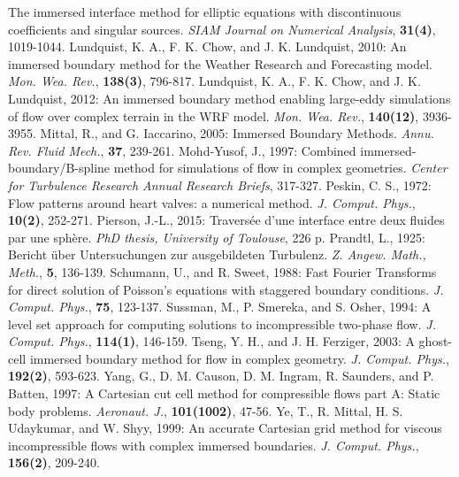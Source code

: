 The immersed interface method for elliptic equations with discontinuous coefficients and singular sources.
{\it SIAM Journal on Numerical Analysis}, {\bf 31(4)}, 1019-1044.
\decrefname
Lundquist, K. A., F. K. Chow, and J. K. Lundquist, 2010:
An immersed boundary method for the Weather Research and Forecasting model.
{\it Mon. Wea. Rev.}, {\bf 138(3)}, 796-817.
\decrefname
Lundquist, K. A., F. K. Chow, and J. K. Lundquist, 2012:
An immersed boundary method enabling large-eddy simulations of flow over complex terrain in the WRF model.
{\it Mon. Wea. Rev.}, {\bf 140(12)}, 3936-3955.
\decrefname
Mittal, R., and G. Iaccarino, 2005:
Immersed Boundary Methods.
{\it Annu. Rev. Fluid Mech.}, {\bf 37}, 239-261.
\decrefname
Mohd-Yusof, J., 1997:
Combined immersed-boundary/B-spline method for simulations of flow in complex geometries.
{\it Center for Turbulence Research Annual Research Briefs}, 317-327.
\decrefname
Peskin, C. S., 1972:
Flow patterns around heart valves: a numerical method.
{\it J. Comput. Phys.}, {\bf 10(2)}, 252-271.
\decrefname
Pierson, J.-L., 2015:
Traversée d’une interface entre deux fluides par une sphère.
{\it PhD thesis, University of Toulouse}, 226 p.
\decrefname
Prandtl, L., 1925:
Bericht über Untersuchungen zur ausgebildeten Turbulenz.
{\it Z. Angew. Math., Meth.}, {\bf 5}, 136-139.
\decrefname
Schumann, U., and R. Sweet, 1988:
Fast Fourier Transforms for direct solution of Poisson's equations with staggered boundary conditions.
{\it J. Comput. Phys.}, {\bf 75}, 123-137.
\decrefname
Sussman, M., P. Smereka, and S. Osher, 1994:
A level set approach for computing solutions to incompressible two-phase flow.
{\it J. Comput. Phys.}, {\bf 114(1)}, 146-159.
\decrefname
Tseng, Y. H., and J. H. Ferziger, 2003:
A ghost-cell immersed boundary method for flow in complex geometry.
{\it J. Comput. Phys.}, {\bf 192(2)}, 593-623.
\decrefname
Yang, G., D. M. Causon, D. M. Ingram, R. Saunders, and P. Batten, 1997:
A Cartesian cut cell method for compressible flows part A: Static body problems.
{\it Aeronaut. J.}, {\bf 101(1002)}, 47-56.
\decrefname
Ye, T., R. Mittal, H. S. Udaykumar, and W. Shyy, 1999:
An accurate Cartesian grid method for viscous incompressible flows with complex immersed boundaries.
{\it J. Comput. Phys.}, {\bf 156(2)}, 209-240.
